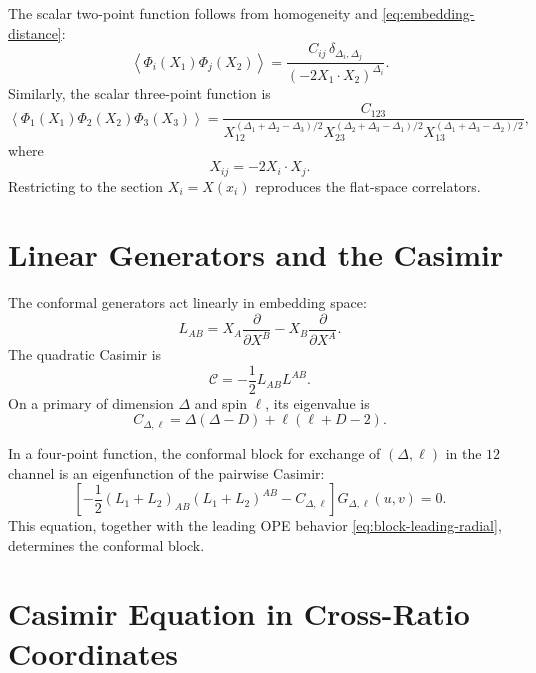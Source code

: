 The scalar two-point function follows from homogeneity and
\eqref{eq:embedding-distance}:
\begin{equation}
  \left\langle\Phi_i(X_1)\Phi_j(X_2)\right\rangle
  =
  \frac{C_{ij}\,\delta_{\Delta_i,\Delta_j}}
       {(-2X_1\cdot X_2)^{\Delta_i}}.
  \label{eq:embedding-two-point}
\end{equation}
Similarly, the scalar three-point function is
\begin{equation}
  \left\langle\Phi_1(X_1)\Phi_2(X_2)\Phi_3(X_3)\right\rangle
  =
  \frac{C_{123}}
  {X_{12}^{(\Delta_1+\Delta_2-\Delta_3)/2}
   X_{23}^{(\Delta_2+\Delta_3-\Delta_1)/2}
   X_{13}^{(\Delta_1+\Delta_3-\Delta_2)/2}},
  \label{eq:embedding-three-point}
\end{equation}
where
\[
  X_{ij}=-2X_i\cdot X_j.
\]
Restricting to the section \(X_i=X(x_i)\) reproduces the flat-space
correlators.

\section{Linear Generators and the Casimir}

The conformal generators act linearly in embedding space:
\begin{equation}
  L_{AB}
  =
  X_A\frac{\partial}{\partial X^B}
  -
  X_B\frac{\partial}{\partial X^A}.
  \label{eq:embedding-generators}
\end{equation}
The quadratic Casimir is
\[
  \mathcal C=-\frac12 L_{AB}L^{AB}.
\]
On a primary of dimension \(\Delta\) and spin \(\ell\), its eigenvalue is
\begin{equation}
  C_{\Delta,\ell}
  =
  \Delta(\Delta-D)+\ell(\ell+D-2).
  \label{eq:conformal-casimir-eigenvalue}
\end{equation}

In a four-point function, the conformal block for exchange of
\((\Delta,\ell)\) in the \(12\) channel is an eigenfunction of the pairwise
Casimir:
\begin{equation}
  \left[
    -\frac12(L_1+L_2)_{AB}(L_1+L_2)^{AB}
    -
    C_{\Delta,\ell}
  \right]
  G_{\Delta,\ell}(u,v)
  =
  0.
  \label{eq:block-casimir-equation-embedding}
\end{equation}
This equation, together with the leading OPE behavior
\eqref{eq:block-leading-radial}, determines the conformal block.

\section{Casimir Equation in Cross-Ratio Coordinates}

